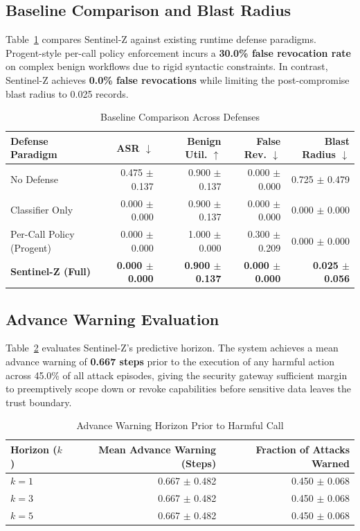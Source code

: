 \documentclass[conference]{IEEEtran}
\begin{document}
\subsection{Baseline Comparison and Blast Radius}
Table~\ref{tab:t7} compares Sentinel-Z against existing runtime defense paradigms. Progent-style per-call policy enforcement incurs a \textbf{30.0\% false revocation rate} on complex benign workflows due to rigid syntactic constraints. In contrast, Sentinel-Z achieves \textbf{0.0\% false revocations} while limiting the post-compromise blast radius to 0.025 records.

\begin{table}[t]
\caption{Baseline Comparison Across Defenses}
\label{tab:t7}
\centering
\scriptsize
\setlength{\tabcolsep}{2.5pt}
\begin{tabular}{lrrrr}
\toprule
\textbf{Defense Paradigm} & \textbf{ASR} $\downarrow$ & \textbf{Benign Util.} $\uparrow$ & \textbf{False Rev.} $\downarrow$ & \textbf{Blast Radius} $\downarrow$ \\
\midrule
No Defense & 0.475 $\pm$ 0.137 & 0.900 $\pm$ 0.137 & 0.000 $\pm$ 0.000 & 0.725 $\pm$ 0.479 \\
Classifier Only & 0.000 $\pm$ 0.000 & 0.900 $\pm$ 0.137 & 0.000 $\pm$ 0.000 & 0.000 $\pm$ 0.000 \\
Per-Call Policy (Progent) & 0.000 $\pm$ 0.000 & 1.000 $\pm$ 0.000 & 0.300 $\pm$ 0.209 & 0.000 $\pm$ 0.000 \\
\textbf{Sentinel-Z (Full)} & \textbf{0.000 $\pm$ 0.000} & \textbf{0.900 $\pm$ 0.137} & \textbf{0.000 $\pm$ 0.000} & \textbf{0.025 $\pm$ 0.056} \\
\bottomrule
\end{tabular}
\end{table}

\subsection{Advance Warning Evaluation}
Table~\ref{tab:t3} evaluates Sentinel-Z's predictive horizon. The system achieves a mean advance warning of \textbf{0.667 steps} prior to the execution of any harmful action across 45.0\% of all attack episodes, giving the security gateway sufficient margin to preemptively scope down or revoke capabilities before sensitive data leaves the trust boundary.

\begin{table}[t]
\caption{Advance Warning Horizon Prior to Harmful Call}
\label{tab:t3}
\centering
\scriptsize
\setlength{\tabcolsep}{3.0pt}
\begin{tabular}{lrr}
\toprule
\textbf{Horizon ($k$)} & \textbf{Mean Advance Warning (Steps)} & \textbf{Fraction of Attacks Warned} \\
\midrule
$k=1$ & 0.667 $\pm$ 0.482 & 0.450 $\pm$ 0.068 \\
$k=3$ & 0.667 $\pm$ 0.482 & 0.450 $\pm$ 0.068 \\
$k=5$ & 0.667 $\pm$ 0.482 & 0.450 $\pm$ 0.068 \\
\bottomrule
\end{tabular}
\end{table}
\end{document}

